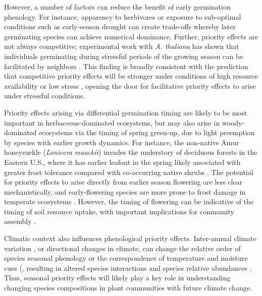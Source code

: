 \documentclass[11pt]{article}
\begin{document}
However, a number of factors can reduce the benefit of early germination phenology. For instance, apparency to herbivores \citep{waterton2016trade} or exposure to sub-optimal conditions such as early-season drought \citep{wainwright2012seasonal} can create trade-offs whereby later germinating species can achieve numerical dominance. Further, priority effects are not always competitive; experimental work with \textit{A. thaliana} has shown that individuals germinating during stressful periods of the growing season can be facilitated by neighbors \citep{leverett2017germination}. This finding is broadly consistent with the prediction that competitive priority effects will be stronger under conditions of high resource availability or low stress \citep{vannette2014historical}, opening the door for facilitative priority effects to arise under stressful conditions.

Priority effects arising via differential germination timing are likely to be most important in herbaceous-dominated ecosystems, but may also arise in woody-dominated ecosystems via the timing of spring green-up, due to light preemption by species with earlier growth dynamics. For instance, the non-native Amur honeysuckle (\textit{Lonicera maackii}) invades the understory of deciduous forests in the Eastern U.S., where it has earlier leafout in the spring likely associated with greater frost tolerance compared with co-occurring native shrubs \citep{mcewan2009leaf}. The potential for priority effects to arise directly from earlier season flowering are less clear mechanistically, and early-flowering species are more prone to frost damage in temperate ecosystems \citep{inouye2008effects}. However, the timing of flowering can be indicative of the timing of soil resource uptake, with important implications for community assembly \citep{gulmon1983phenology,seabloom2003invasion}.

Climatic context also influences phenological priority effects. Inter-annual climate variation \citep{levine2011seasonal}, or directional changes in climate, can change the relative order of species seasonal phenology or the correspondence of temperature and moisture cues (\cite{kimball2010contemporary}, resulting in altered species interactions and species relative abundances \citep{thomson2017between,kimball2010contemporary,buonaiuto2023contrasting}. Thus, seasonal priority effects will likely play a key role in understanding changing species compositions in plant communities with future climate change.
\end{document}
